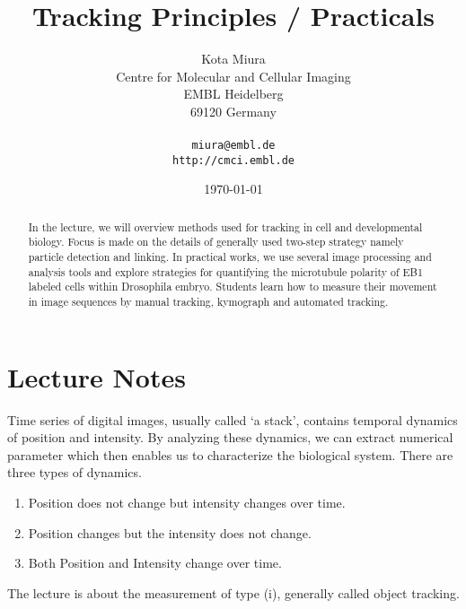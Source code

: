 \documentclass[11pnt]{article}
\begin{document}
\author{Kota Miura\\
  Centre for Molecular and Cellular Imaging\\
  EMBL Heidelberg\\
  69120  Germany\\
  \\
  \texttt{miura@embl.de}\\
  \texttt{http://cmci.embl.de}}
\date{\today}
\title{Tracking Principles / Practicals}
\maketitle

\begin{abstract}
In the lecture, we will overview methods used for tracking in cell and developmental biology. Focus is made on the details of generally used two-step strategy namely particle detection and linking. In practical works, we use several image processing and analysis tools and explore strategies for quantifying the microtubule polarity of EB1 labeled cells within Drosophila embryo. Students learn how to measure their movement in image sequences by manual tracking, kymograph and automated tracking. 
\end{abstract}

\section{Lecture Notes}

Time series of digital images, usually called ‘a stack’, contains temporal dynamics of position and intensity. By analyzing these dynamics, we can extract numerical parameter which then enables us to characterize the biological system. There are three types of dynamics. 
\begin{enumerate}
\item Position does not change but intensity changes over time. 
\item Position changes but the intensity does not change. 
\item Both Position and Intensity change over time. 
\end{enumerate}
The lecture is about the measurement of type (i), generally called object tracking. 
\end{document}
